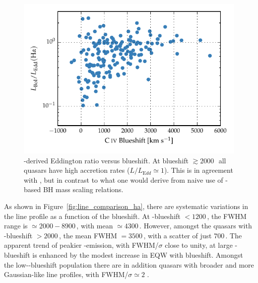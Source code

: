 
\begin{figure}
    \centering
    \includegraphics[width=0.8\linewidth]{figures/chapter03/ha_edd_civ_bs.pdf}
    \caption[{\hans-derived Eddington ratio versus  blueshift.}]{\hans-derived Eddington ratio versus  blueshift. At blueshift $\gtrsim2000$\,\kms\, all quasars have high accretion rates ($L/L_{\mathrm Edd} \simeq 1$). This is in agreement with \citet{kratzer15}, but in contrast to what one would derive from naive use of -based BH mass scaling relations.}
    \label{fig:ha_edd_civ_bs}
\end{figure}

As shown in Figure~\ref{fig:line_comparison_ha}, there are systematic variations in the \ha line profile as a function of the  blueshift. 
At -blueshift $<1200$\,\kms, the \ha FWHM range is $\simeq2000 - 8900$\,\kms, with mean $\simeq4300$\,\kms.
However, amongst the quasars with -blueshift $>2000$\,\kms, the mean \ha FWHM $=3500$\,\kms, with a scatter of just $700$\,\kms. 
The apparent trend of peakier \hans-emission, with FWHM/$\sigma$ close to unity, at large -blueshift is enhanced by the modest increase in \ha EQW with blueshift. 
Amongst the low--blueshift population there are in addition quasars with broader and more Gaussian-like \ha line profiles, with FWHM/$\sigma \simeq 2$ . 


